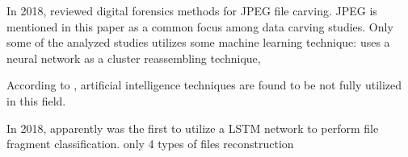 In 2018, \cite{ali_review_2018} reviewed digital forensics methods for JPEG file carving. JPEG is mentioned in this paper as a common focus among data carving studies. Only some of the analyzed studies utilizes some machine learning technique: \cite{xu_reassembling_2009} uses a neural network as a cluster reassembling technique, 


According to \cite{ali_review_2018}, artificial intelligence techniques are found to be not fully utilized in this field.

In 2018, \cite{hiester_file_2018} apparently was the first to utilize a LSTM network to perform file fragment classification.
only 4 types of files
reconstruction

